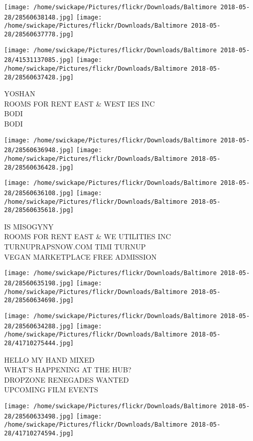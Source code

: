 \documentclass[10pt,letterpaper]{article}
\begin{document}
\texttt{[image: /home/swickape/Pictures/flickr/Downloads/Baltimore 2018-05-28/28560638148.jpg]}
\texttt{[image: /home/swickape/Pictures/flickr/Downloads/Baltimore 2018-05-28/28560637778.jpg]}

\texttt{[image: /home/swickape/Pictures/flickr/Downloads/Baltimore 2018-05-28/41531137085.jpg]}
\texttt{[image: /home/swickape/Pictures/flickr/Downloads/Baltimore 2018-05-28/28560637428.jpg]}

YOSHAN\\
ROOMS FOR RENT EAST \& WEST IES INC\\
BODI\\
BODI\\
\pagebreak

\texttt{[image: /home/swickape/Pictures/flickr/Downloads/Baltimore 2018-05-28/28560636948.jpg]}
\texttt{[image: /home/swickape/Pictures/flickr/Downloads/Baltimore 2018-05-28/28560636428.jpg]}

\texttt{[image: /home/swickape/Pictures/flickr/Downloads/Baltimore 2018-05-28/28560636108.jpg]}
\texttt{[image: /home/swickape/Pictures/flickr/Downloads/Baltimore 2018-05-28/28560635618.jpg]}

IS MISOGYNY\\
ROOMS FOR RENT EAST \& WE UTILITIES INC\\
TURNUPRAPSNOW.COM TIMI TURNUP\\
VEGAN MARKETPLACE FREE ADMISSION\\
\pagebreak

\texttt{[image: /home/swickape/Pictures/flickr/Downloads/Baltimore 2018-05-28/28560635198.jpg]}
\texttt{[image: /home/swickape/Pictures/flickr/Downloads/Baltimore 2018-05-28/28560634698.jpg]}

\texttt{[image: /home/swickape/Pictures/flickr/Downloads/Baltimore 2018-05-28/28560634288.jpg]}
\texttt{[image: /home/swickape/Pictures/flickr/Downloads/Baltimore 2018-05-28/41710275444.jpg]}

HELLO MY HAND MIXED\\
WHAT'S HAPPENING AT THE HUB?\\
DROPZONE RENEGADES WANTED\\
UPCOMING FILM EVENTS\\
\pagebreak

\texttt{[image: /home/swickape/Pictures/flickr/Downloads/Baltimore 2018-05-28/28560633498.jpg]}
\texttt{[image: /home/swickape/Pictures/flickr/Downloads/Baltimore 2018-05-28/41710274594.jpg]}
\end{document}

